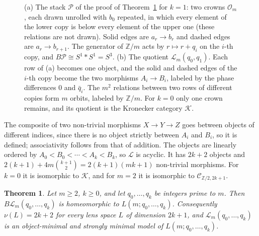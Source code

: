 \documentclass[12pt]{amsart}
\newtheorem{theorem}[teo]{Theorem}
\theoremstyle{definition}
\theoremstyle{remark}
\newcommand{\CC}{\mathcal{C}}
\newcommand{\PP}{\mathcal{P}}
\newcommand{\Z}{\mathbb{Z}}
\newcommand{\K}{\mathcal{K}}
\begin{document}
\begin{figure}[ht]
\caption{(a) The stack $\PP$ of the proof of Theorem~\ref{thm:lens} for $k=1$: two crowns $\mathcal O_m$, each drawn unrolled with $b_0$ repeated, in which every element of the lower copy is below every element of the upper one (these relations are not drawn). Solid edges are $a_r\to b_r$ and dashed edges are $a_r\to b_{r+1}$. The generator of $\Z/m$ acts by $r\mapsto r+q_i$ on the $i$-th copy, and $B\PP\cong S^1*S^1=S^3$. (b) The quotient $\mathcal L_m(q_0,q_1)$. Each row of (a) becomes one object, and the solid and dashed edges of the $i$-th copy become the two morphisms $A_i\to B_i$, labeled by the phase differences $0$ and $\bar q_i$. The $m^2$ relations between two rows of different copies form $m$ orbits, labeled by $\Z/m$. For $k=0$ only one crown remains, and its quotient is the Kronecker category $\K$.}
\label{fig:lens-stack}
\end{figure}

The composite of two non-trivial morphisms $X\to Y\to Z$ goes between objects of different indices, since there is no object strictly between $A_i$ and $B_i$, so it is defined; associativity follows from that of addition. The objects are linearly ordered by $A_0<B_0<\cdots<A_k<B_k$, so $\mathcal L$ is acyclic. It has $2k+2$ objects and $2(k+1)+4m\binom{k+1}{2}=2(k+1)(mk+1)$ non-trivial morphisms. For $k=0$ it is isomorphic to $\K$, and for $m=2$ it is isomorphic to $\CC_{\Z/2,2k+1}$.

\begin{theorem}\label{thm:lens}
Let $m\ge2$, $k\ge0$, and let $q_0,\dots,q_k$ be integers prime to $m$. Then $B\mathcal L_m(q_0,\dots,q_k)$ is homeomorphic to $L(m;q_0,\dots,q_k)$. Consequently $\nu(L)=2k+2$ for every lens space $L$ of dimension $2k+1$, and $\mathcal L_m(q_0,\dots,q_k)$ is an object-minimal and strongly minimal model of $L(m;q_0,\dots,q_k)$.
\end{theorem}
\end{document}

